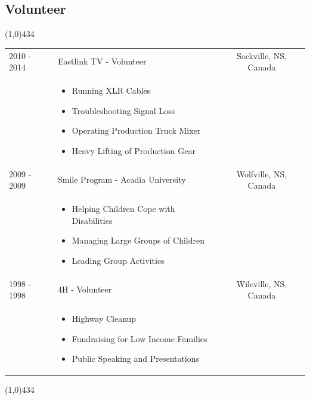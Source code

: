 \documentclass{res}
\newcommand{\frstCVcell}{2.5cm}
\begin{document}
\begin{resume}
  \section{Volunteer}
  \line(1,0){434}
  \newline
  \newline
  \begin{tabularx}{\textwidth}{p{\frstCVcell}Xc}
    2010 - 2014 & Eastlink TV - Volunteer & Sackville, NS, Canada\\
    &
    \begin{itemize}
    \item Running XLR Cables
    \item Troubleshooting Signal Loss
    \item Operating Production Truck Mixer
    \item Heavy Lifting of Production Gear
    \end{itemize}
    & \\
    2009 - 2009 & Smile Program - Acadia University & Wolfville, NS, Canada\\
    &
    \begin{itemize}
    \item Helping Children Cope with Disabilities
    \item Managing Large Groups of Children
    \item Leading Group Activities
    \end{itemize}
    & \\
    1998 - 1998 & 4H - Volunteer & Wileville, NS, Canada\\
    &
    \begin{itemize}
    \item Highway Cleanup
    \item Fundraising for Low Income Families
    \item Public Speaking and Presentations
    \end{itemize}
    & \\
  \end{tabularx}
  \newline
  \line(1,0){434}
 
  \end{resume}
  
\end{document}
